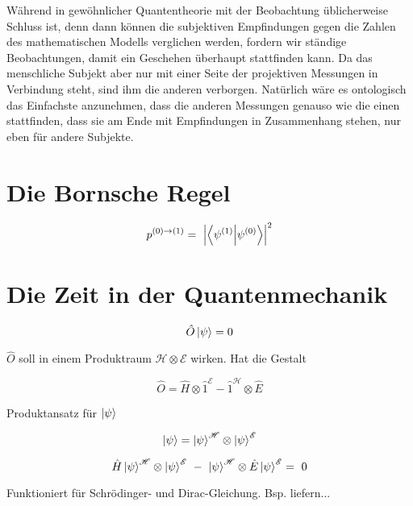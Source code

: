 \documentclass[12pt]{article}
\begin{document}
Während in gewöhnlicher Quantentheorie mit der Beobachtung üblicherweise Schluss ist, denn dann können die subjektiven Empfindungen gegen die Zahlen des mathematischen Modells verglichen werden, fordern wir ständige Beobachtungen, damit ein Geschehen überhaupt stattfinden kann. Da das menschliche Subjekt aber nur mit einer Seite der projektiven Messungen in Verbindung steht, sind ihm die anderen verborgen. Natürlich wäre es ontologisch das Einfachste anzunehmen, dass die anderen Messungen genauso wie die einen stattfinden, dass sie am Ende mit Empfindungen in Zusammenhang stehen, nur eben für andere Subjekte. 

\section{Die Bornsche Regel}

\begin{equation} 
p^{(0)\rightarrow(1)} =\ \Bigl| \bra{\psi^{(1)}}\ket{\psi^{(0)}} \Bigr| ^2
\end{equation}



\section{Die Zeit in der Quantenmechanik}

\begin{equation} 
\hat{O}\ket{\psi} = 0 
\end{equation}

$\hat{O}$ soll in einem Produktraum $\mathscr{H} \otimes \mathscr{E}$ wirken. Hat die Gestalt 

\begin{equation} 
\hat{O} = \hat{H} \otimes \hat{1}^{\mathscr{E}} - \hat{1}^{\mathscr{H}} \otimes \hat{E}
\end{equation}

Produktansatz für $\ket{\psi}$

\begin{equation} 
\ket{\psi} = \ket{\psi}^{\mathscr{H}} \otimes \ket{\psi}^{\mathscr{E}}
\end{equation}

\begin{equation} 
\hat{H}\ket{\psi}^{\mathscr{H}} \otimes \ket{\psi}^{\mathscr{E}} 
\ - \ 
\ket{\psi}^{\mathscr{H}} \otimes \hat{E}\ket{\psi}^{\mathscr{E}} =\ 0
\end{equation}

Funktioniert für Schrödinger- und Dirac-Gleichung. Bsp. liefern...
\end{document}
